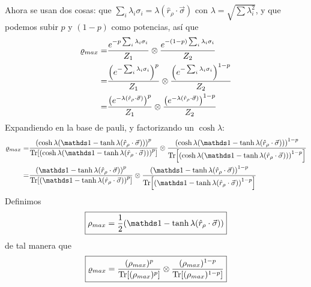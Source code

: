 Ahora se usan dos cosas: que $\sum_{i}\lambda_{i}\sigma_{i}=\lambda(\hat{r}_{\rho}\cdot\vec{\sigma})$ con $\lambda=\sqrt{\sum \lambda_{i}^{2}}$, y que podemos subir $p$ y $(1-p)$ como potencias, así que
\begin{align*}
  \varrho_{max}=&\frac{e^{-p\sum_{i}\lambda_{i}\sigma_{i}}}{Z_{1}} \otimes \frac{e^{-(1-p)\sum_{i}\lambda_{i}\sigma_{i}}}{Z_{2}}\\
  =&\frac{\qty(e^{-\sum_{i}\lambda_{i}\sigma_{i}})^{p} }{Z_{1}}\otimes \frac{\qty(e^{-\sum_{i}\lambda_{i}\sigma_{i}})^{1-p}}{Z_{2}}\\
  =&\frac{\qty(e^{-\lambda(\hat{r}_{\rho}\cdot\vec{\sigma})})^{p}}{Z_{1}} \otimes \frac{\qty(e^{-\lambda(\hat{r}_{\rho}\cdot\vec{\sigma})})^{1-p}}{Z_{2}}\\
\end{align*}
Expandiendo en la base de pauli, y factorizando un $\cosh{\lambda}$:
\begin{align*}
  \varrho_{max}=&\frac{\qty(\cosh{\lambda}(\Id-\tanh{\lambda}(\hat{r}_{\rho}\cdot\vec{\sigma})))^{p}}{\Tr[\qty(\cosh{\lambda}(\Id-\tanh{\lambda}(\hat{r}_{\rho}\cdot\vec{\sigma})))^{p}]} \otimes \frac{\qty(\cosh{\lambda}(\Id-\tanh{\lambda}(\hat{r}_{\rho}\cdot\vec{\sigma})))^{1-p}}{\Tr[\qty(\cosh{\lambda}(\Id-\tanh{\lambda}(\hat{r}_{\rho}\cdot\vec{\sigma})))^{1-p}]}\\
  =&\frac{\qty(\Id-\tanh{\lambda}(\hat{r}_{\rho}\cdot\vec{\sigma}))^{p}}{\Tr[\qty(\Id-\tanh{\lambda}(\hat{r}_{\rho}\cdot\vec{\sigma}))^{p}]} \otimes \frac{\qty(\Id-\tanh{\lambda}(\hat{r}_{\rho}\cdot\vec{\sigma}))^{1-p}}{\Tr[\qty(\Id-\tanh{\lambda}(\hat{r}_{\rho}\cdot\vec{\sigma}))^{1-p}]}
\end{align*}
Definimos
\begin{equation}
  \boxed{\rho_{max}=\frac{1}{2}(\Id-\tanh{\lambda}(\hat{r}_{\rho}\cdot\vec{\sigma}))}
\end{equation}
de tal manera que 
\begin{equation}\label{eq:MaxEntSeparableLM}
  \boxed{\varrho_{max}=\frac{(\rho_{max})^{p}}{\Tr[ (\rho_{max})^{p}]}\otimes\frac{(\rho_{max})^{1-p}}{\Tr[(\rho_{max})^{1-p}]}}
\end{equation}


